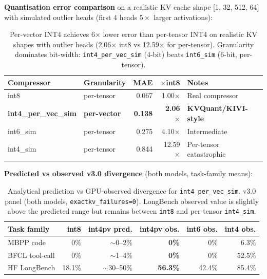 \documentclass[11pt]{article}
\begin{document}
\textbf{Quantisation error comparison} on a realistic KV cache shape [1, 32, 512, 64]
with simulated outlier heads (first 4 heads $5\times$ larger activations):

\begin{table}[htbp]
\centering\small
\begin{tabular}{llrrl}
\toprule
\textbf{Compressor} & \textbf{Granularity} & \textbf{MAE} & \textbf{$\times$int8} & \textbf{Notes} \\
\midrule
int8            & per-tensor &  0.067 & 1.00$\times$ & Real compressor \\
\textbf{int4\_per\_vec\_sim} & \textbf{per-vector} & \textbf{0.138} & \textbf{2.06$\times$} & \textbf{KVQuant/KIVI-style} \\
int6\_sim       & per-tensor &  0.275 & 4.10$\times$ & Intermediate \\
int4\_sim       & per-tensor &  0.844 & 12.59$\times$ & Per-tensor catastrophic \\
\bottomrule
\end{tabular}
\caption{Per-vector INT4 achieves 6$\times$ lower error than per-tensor INT4 on
realistic KV shapes with outlier heads (2.06$\times$ int8 vs 12.59$\times$ for
per-tensor). Granularity dominates bit-width: \texttt{int4\_per\_vec\_sim} (4-bit) beats
\texttt{int6\_sim} (6-bit, per-tensor).}
\label{tab:per-vec-error}
\end{table}

\noindent\textbf{Predicted vs observed v3.0 divergence} (both models, task-family means):

\begin{table}[htbp]
\centering\small\setlength\tabcolsep{3pt}
\begin{tabular}{lrrrrr}
\toprule
\textbf{Task family} & \textbf{int8} & \textbf{int4pv pred.} & \textbf{int4pv obs.} & \textbf{int6 obs.} & \textbf{int4 obs.} \\
\midrule
MBPP code      &  0\%   & $\sim$0--2\%   & \textbf{0\%}   & 0\%   & 6.3\% \\
BFCL tool-call &  0\%   & $\sim$1--4\%   & \textbf{0\%}   & 0\%   & 52.5\% \\
HF LongBench   & 18.1\% & $\sim$30--50\% & \textbf{56.3\%} & 42.4\% & 85.4\% \\
\bottomrule
\end{tabular}
\caption{Analytical prediction vs GPU-observed divergence for \texttt{int4\_per\_vec\_sim}.
v3.0 panel (both models, \texttt{exactkv\_failures=0}). LongBench observed value is
slightly above the predicted range but remains between \texttt{int8} and per-tensor
\texttt{int4\_sim}.}
\label{tab:per-vec-pred}
\end{table}
\end{document}
